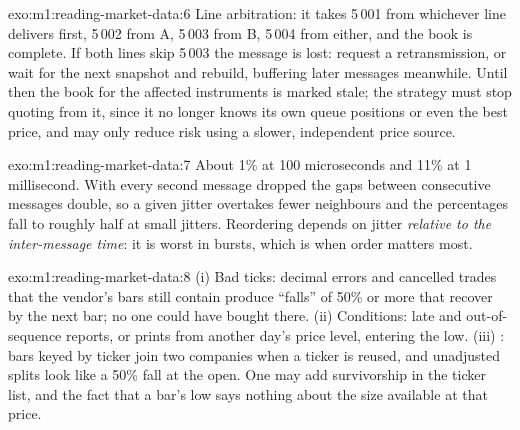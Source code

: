 \begin{solution}{exo:m1:reading-market-data:6}
Line arbitration: it takes 5\,001 from whichever line delivers first, 5\,002
from A, 5\,003 from B, 5\,004 from either, and the book is complete. If both
lines skip 5\,003 the message is lost: request a retransmission, or wait for
the next snapshot and rebuild, buffering later messages meanwhile. Until
then the book for the affected instruments is marked stale; the strategy
must stop quoting from it, since it no longer knows its own queue positions
or even the best price, and may only reduce risk using a slower, independent
price source.
\end{solution}

\begin{solution}{exo:m1:reading-market-data:7}
About 1\% at 100 microseconds and 11\% at 1 millisecond. With every second
message dropped the gaps between consecutive messages double, so a given
jitter overtakes fewer neighbours and the percentages fall to roughly half
at small jitters. Reordering depends on jitter \emph{relative to the
inter-message time}: it is worst in bursts, which is when order matters
most.
\end{solution}

\begin{solution}{exo:m1:reading-market-data:8}
(i) Bad ticks: decimal errors and cancelled trades that the vendor's bars
still contain produce ``falls'' of 50\% or more that recover by the next bar;
no one could have bought there. (ii) Conditions: late and out-of-sequence
reports, or prints from another day's price level, entering the low. (iii)
: bars keyed by ticker join two companies when a ticker is reused,
and unadjusted splits look like a 50\% fall at the open. One may add
survivorship in the ticker list, and the fact that a bar's low says nothing
about the size available at that price.
\end{solution}

